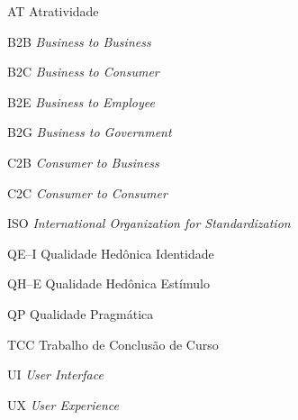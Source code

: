 \begin{siglas}
    \item[AT] Atratividade
    \item[B2B] \textit{Business to Business}
    \item[B2C] \textit{Business to Consumer}
    \item[B2E] \textit{Business to Employee}
    \item[B2G] \textit{Business to Government}
    \item[C2B] \textit{Consumer to Business}
    \item[C2C] \textit{Consumer to Consumer}
    \item[ISO] \textit{International Organization for Standardization}
    \item[QE–I] Qualidade Hedônica Identidade
    \item[QH–E] Qualidade Hedônica Estímulo
    \item[QP] Qualidade Pragmática
    \item[TCC] Trabalho de Conclusão de Curso
    \item[UI] \textit{User Interface}
    \item[UX] \textit{User Experience}
    \item[] \textit{}

\end{siglas}

